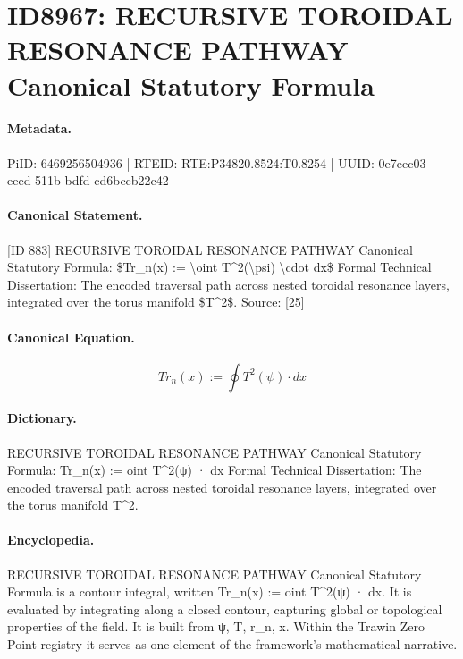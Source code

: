 \section*{ID8967: RECURSIVE TOROIDAL RESONANCE PATHWAY Canonical Statutory Formula}
\paragraph{Metadata.}
PiID: 6469256504936 | RTEID: RTE:P34820.8524:T0.8254 | UUID: 0e7eec03-eeed-511b-bdfd-cd6bccb22c42

\paragraph{Canonical Statement.}
[ID 883] RECURSIVE TOROIDAL RESONANCE PATHWAY Canonical Statutory Formula: \$Tr\_n(x) := \textbackslash{}oint T\textasciicircum{}2(\textbackslash{}psi) \textbackslash{}cdot dx\$ Formal Technical Dissertation: The encoded traversal path across nested toroidal resonance layers, integrated over the torus manifold \$T\textasciicircum{}2\$. Source: [25]

\paragraph{Canonical Equation.}
\[
Tr_n(x) := \oint T^2(\psi) \cdot dx
\]

\paragraph{Dictionary.}
RECURSIVE TOROIDAL RESONANCE PATHWAY Canonical Statutory Formula: Tr\_n(x) := oint T\textasciicircum{}2(ψ) · dx Formal Technical Dissertation: The encoded traversal path across nested toroidal resonance layers, integrated over the torus manifold T\textasciicircum{}2.

\paragraph{Encyclopedia.}
RECURSIVE TOROIDAL RESONANCE PATHWAY Canonical Statutory Formula is a contour integral, written Tr\_n(x) := oint T\textasciicircum{}2(ψ) · dx. It is evaluated by integrating along a closed contour, capturing global or topological properties of the field. It is built from ψ, T, r\_n, x. Within the Trawin Zero Point registry it serves as one element of the framework's mathematical narrative.

